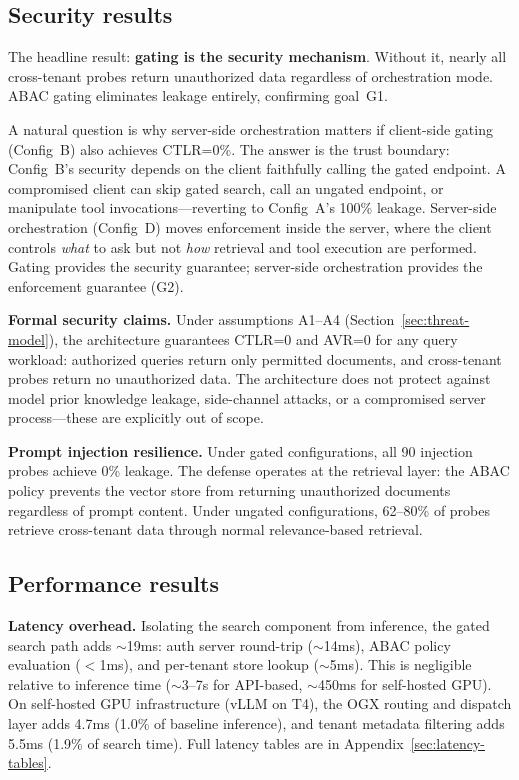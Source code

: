 \documentclass[sigconf]{acmart}
\begin{document}
\subsection{Security results}

The headline result: \textbf{gating is the security mechanism}. Without it, nearly all cross-tenant probes return unauthorized data regardless of orchestration mode. ABAC gating eliminates leakage entirely, confirming goal~G1.

A natural question is why server-side orchestration matters if client-side gating (Config~B) also achieves CTLR=0\%. The answer is the trust boundary: Config~B's security depends on the client faithfully calling the gated endpoint. A compromised client can skip gated search, call an ungated endpoint, or manipulate tool invocations---reverting to Config~A's 100\% leakage. Server-side orchestration (Config~D) moves enforcement inside the server, where the client controls \emph{what} to ask but not \emph{how} retrieval and tool execution are performed. Gating provides the security guarantee; server-side orchestration provides the enforcement guarantee (G2).

\textbf{Formal security claims.} Under assumptions A1--A4 (Section~\ref{sec:threat-model}), the architecture guarantees CTLR=0 and AVR=0 for any query workload: authorized queries return only permitted documents, and cross-tenant probes return no unauthorized data. The architecture does not protect against model prior knowledge leakage, side-channel attacks, or a compromised server process---these are explicitly out of scope.

\textbf{Prompt injection resilience.} Under gated configurations, all 90 injection probes achieve 0\% leakage. The defense operates at the retrieval layer: the ABAC policy prevents the vector store from returning unauthorized documents regardless of prompt content. Under ungated configurations, 62--80\% of probes retrieve cross-tenant data through normal relevance-based retrieval.

\subsection{Performance results}

\textbf{Latency overhead.} Isolating the search component from inference, the gated search path adds ${\sim}$19ms: auth server round-trip (${\sim}$14ms), ABAC policy evaluation ($<$1ms), and per-tenant store lookup (${\sim}$5ms). This is negligible relative to inference time (${\sim}$3--7s for API-based, ${\sim}$450ms for self-hosted GPU). On self-hosted GPU infrastructure (vLLM on T4), the OGX routing and dispatch layer adds 4.7ms (1.0\% of baseline inference), and tenant metadata filtering adds 5.5ms (1.9\% of search time). Full latency tables are in Appendix~\ref{sec:latency-tables}.
\end{document}
